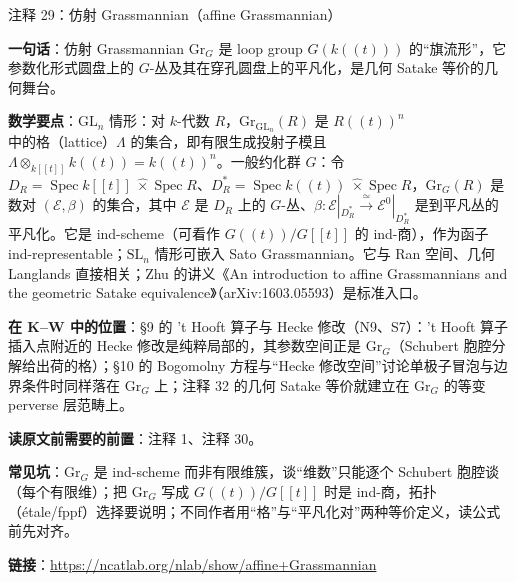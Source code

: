 \begin{kcard}{注释 29：仿射 Grassmannian（affine Grassmannian）}

\textbf{一句话}：仿射 Grassmannian $\mathrm{Gr}_G$ 是 loop group $G(k((t)))$ 的“旗流形”，它参数化形式圆盘上的 $G$-丛及其在穿孔圆盘上的平凡化，是几何 Satake 等价的几何舞台。

\textbf{数学要点}：$\mathrm{GL}_n$ 情形：对 $k$-代数 $R$，$\mathrm{Gr}_{\mathrm{GL}_n}(R)$ 是 $R((t))^n$ 中的格（lattice）$\Lambda$ 的集合，即有限生成投射子模且 $\Lambda\otimes_{k[[t]]}k((t))=k((t))^n$。一般约化群 $G$：令 $D_R=\operatorname{Spec} k[[t]]\ \widehat\times\operatorname{Spec} R$、$D^*_R=\operatorname{Spec} k((t))\ \widehat\times\operatorname{Spec} R$，$\mathrm{Gr}_G(R)$ 是数对 $(\mathcal E,\beta)$ 的集合，其中 $\mathcal E$ 是 $D_R$ 上的 $G$-丛、$\beta:\mathcal E|_{D^*_R}\xrightarrow{\ \simeq\ }\mathcal E^0|_{D^*_R}$ 是到平凡丛的平凡化。它是 ind-scheme（可看作 $G((t))/G[[t]]$ 的 ind-商），作为函子 ind-representable；$\mathrm{SL}_n$ 情形可嵌入 Sato Grassmannian。它与 Ran 空间、几何 Langlands 直接相关；Zhu 的讲义《An introduction to affine Grassmannians and the geometric Satake equivalence》（arXiv:1603.05593）是标准入口。

\textbf{在 K--W 中的位置}：§9 的 't Hooft 算子与 Hecke 修改（N9、S7）：'t Hooft 算子插入点附近的 Hecke 修改是纯粹局部的，其参数空间正是 $\mathrm{Gr}_G$（Schubert 胞腔分解给出荷的格）；§10 的 Bogomolny 方程与“Hecke 修改空间”讨论单极子冒泡与边界条件时同样落在 $\mathrm{Gr}_G$ 上；注释 32 的几何 Satake 等价就建立在 $\mathrm{Gr}_G$ 的等变 perverse 层范畴上。

\textbf{读原文前需要的前置}：注释 1、注释 30。

\textbf{常见坑}：$\mathrm{Gr}_G$ 是 ind-scheme 而非有限维簇，谈“维数”只能逐个 Schubert 胞腔谈（每个有限维）；把 $\mathrm{Gr}_G$ 写成 $G((t))/G[[t]]$ 时是 ind-商，拓扑（étale/fppf）选择要说明；不同作者用“格”与“平凡化对”两种等价定义，读公式前先对齐。

\noindent\textbf{链接}：\url{https://ncatlab.org/nlab/show/affine+Grassmannian}
\end{kcard}

